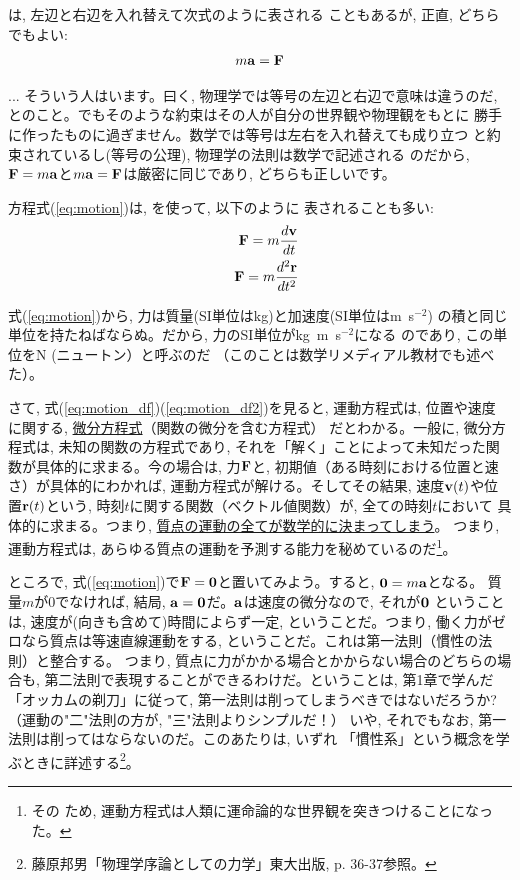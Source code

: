は, 左辺と右辺を入れ替えて次式のように表される
こともあるが, 正直, どちらでもよい:
\begin{eqnarray}
m{\bf a}={\bf F}\label{eq:motion_ma_F}
\end{eqnarray}

\begin{faq}{\small{} ...
そういう人はいます。曰く, 物理学では等号の左辺と右辺で意味は違うのだ, 
とのこと。でもそのような約束はその人が自分の世界観や物理観をもとに
勝手に作ったものに過ぎません。数学では等号は左右を入れ替えても成り立つ
と約束されているし(等号の公理), 物理学の法則は数学で記述される
のだから, ${\bf F}=m{\bf a}$と$m{\bf a}={\bf F}$は厳密に同じであり, 
どちらも正しいです。}\end{faq}

方程式(\ref{eq:motion})は, を使って, 以下のように
表されることも多い: 
\begin{eqnarray}
&&{\bf F}=m\frac{d{\bf v}}{dt}\label{eq:motion_df}\\
&&{\bf F}=m\frac{d^2{\bf r}}{dt^2}\label{eq:motion_df2}
\end{eqnarray}

式(\ref{eq:motion})から, 力は質量(SI単位はkg)と加速度(SI単位はm~s$^{-2}$)
の積と同じ単位を持たねばならぬ。だから, 力のSI単位がkg~m~s$^{-2}$になる
のであり, この単位をN (ニュートン）と呼ぶのだ
（このことは数学リメディアル教材でも述べた）。

さて, 式(\ref{eq:motion_df})(\ref{eq:motion_df2})を見ると, 運動方程式は, 位置や速度
に関する, \underline{微分方程式}（関数の微分を含む方程式）
だとわかる。一般に, 微分方程式は, 未知の関数の方程式であり, 
それを「解く」ことによって未知だった関数が具体的に求まる。今の場合は, 
力${\bf F}$と, 初期値（ある時刻における位置と速さ）が具体的にわかれば, 
運動方程式が解ける。そしてその結果, 速度${\bf v}(t)$や位置${\bf r}(t)$という, 
時刻$t$に関する関数（ベクトル値関数）が, 全ての時刻$t$において
具体的に求まる。つまり, \underline{質点の運動の全てが数学的に決まってしまう}。
つまり, 運動方程式は, あらゆる質点の運動を予測する能力を秘めているのだ\footnote{その
ため, 運動方程式は人類に運命論的な世界観を突きつけることになった。}。

ところで, 式(\ref{eq:motion})で${\bf F}={\bf 0}$と置いてみよう。すると, ${\bf 0}=m{\bf a}$となる。
質量$m$が0でなければ, 結局, ${\bf a}={\bf 0}$だ。${\bf a}$は速度の微分なので, それが${\bf 0}$
ということは, 速度が(向きも含めて)時間によらず一定, ということだ。つまり, 
働く力がゼロなら質点は等速直線運動をする, ということだ。これは第一法則（慣性の法則）と整合する。
つまり, 質点に力がかかる場合とかからない場合のどちらの場合も, 
第二法則で表現することができるわけだ。ということは, 第1章で学んだ「オッカムの剃刀」に従って, 
第一法則は削ってしまうべきではないだろうか?（運動の"二"法則の方が, 
"三"法則よりシンプルだ！） 
いや, それでもなお, 第一法則は削ってはならないのだ。このあたりは, いずれ
「慣性系」という概念を学ぶときに詳述する\footnote{
藤原邦男「物理学序論としての力学」東大出版, p. 36-37参照。}。

